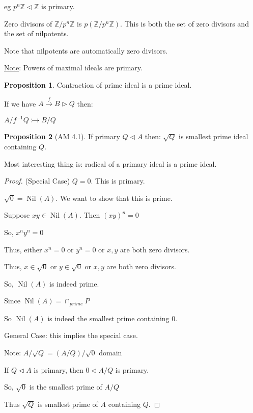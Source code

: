 \documentclass{article}
\theoremstyle{definition}
\newtheorem{proposition}{Proposition}
\begin{document}
eg \(p^n \mathbb{Z} \triangleleft \mathbb{Z}\) is primary.

Zero divisors of \(\mathbb{Z} / p^n \mathbb{Z}\) is \(p(\mathbb{Z}  / p^n \mathbb{Z})\). This is both the set of zero divisors and the set of nilpotents.

Note that nilpotents are automatically zero divisors.

\underline{Note}: Powers of maximal ideals are primary.

\begin{proposition}
    Contraction of prime ideal is a prime ideal.

    If we have \(A \overset{f}{\to} B \triangleright Q\) then:
    
    \(A / f ^{-1} Q \rightarrowtail B / Q\)
    
    
\end{proposition}

\begin{proposition}[AM 4.1]
    If primary \(Q \triangleleft A\) then: \(\sqrt{Q}\) is smallest prime ideal containing \(Q\).

    Most interesting thing is: radical of a primary ideal is a prime ideal.
\end{proposition}

\newcommand{\Nil}{\operatorname{Nil}}

\begin{proof}
    (Special Case) \(Q=0\). This is primary.

    \(\sqrt{0} = \operatorname{Nil}(A)\). We want to show that this is prime.

    Suppose \(xy\in \Nil(A).\) Then \((xy)^n = 0\) 
    
    So, \(x^n y^n = 0\)
    
    Thus, either \(x^n = 0\) or \(y^n = 0\) or \(x,y\) are both zero divisors.

    Thus, \(x\in \sqrt{0}\) or \(y\in \sqrt{0}\) or \(x,y\) are both zero divisors.
    
    So, \(\Nil(A)\) is indeed prime.

    Since \(\Nil(A)=\cap_{prime}P\) 

    So \(\Nil(A)\) is indeed the smallest prime containing \(0\).

    General Case: this implies the special case.

    Note: \(A / \sqrt{Q} = (A / Q) / \sqrt{0}\) domain 

    If \(Q \triangleleft A\) is primary, then \(0 \triangleleft A / Q\) is primary.
    
    So, \(\sqrt{0}\) is the smallest prime of \(A / Q\)
    
    Thus \(\sqrt{Q}\) is smallest prime of \(A\) containing \(Q\).

\end{proof}
\end{document}
